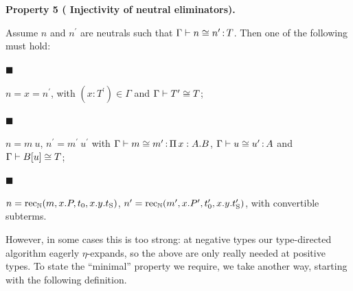 \documentclass[10pt,a4paper]{amsart}
\begin{document}
 
 
\par\medskip\noindent\textbf{Property 5 (  Injectivity of neutral eliminators).}\par
 
 
Assume $n$ and $n^{\prime}$ are neutrals such that $\Gamma\vdash n\mathrel{\raisebox{-0.5pt}{$\cong$}}n^{\prime}\operatorname{%
\mathrel{:}}T$. Then one of the following must hold:\par
  
\par\noindent  $\blacksquare$ 
 
$n=x=n^{\prime}$, with $(x:T^{\prime})\in\Gamma$ and $\Gamma\vdash T^{\prime}\mathrel{\raisebox{-0.5pt}{$\cong$}}T$;\par
 
 
 
\par\noindent  $\blacksquare$ 
 
$n=m\ u$, $n^{\prime}=m^{\prime}\ u^{\prime}$ with $\Gamma\vdash m\mathrel{\raisebox{-0.5pt}{$\cong$}}m^{\prime}\operatorname{%
\mathrel{:}}\operatorname{\Pi}x:A.B$, $\Gamma\vdash u\mathrel{\raisebox{-0.5pt}{$\cong$}}u^{\prime}\operatorname{%
\mathrel{:}}A$ and $\Gamma\vdash B\mathord{\left[u\right]}\mathrel{\raisebox{-0.5pt}{$\cong$}}T$;\par
 
 
 
\par\noindent  $\blacksquare$ 
 
$n=\operatorname{rec}_{\operatorname{\mathbb{N}}}(m,x.P,t_{0},x.y.t_{%
\operatorname{S}})$, $n^{\prime}=\operatorname{rec}_{\operatorname{\mathbb{N}}}(m^{\prime},x.P^{%
\prime},t^{\prime}_{0},x.y.t^{\prime}_{\operatorname{S}})$, with convertible subterms.\par
 
 
  
 
 
 
However, in some cases this is too strong: at negative types our type-directed algorithm eagerly $\eta$-expands, so the above are only really needed at positive types. To state the “minimal” property we require, we take another way, starting with the following definition.\par
 
\end{document}
